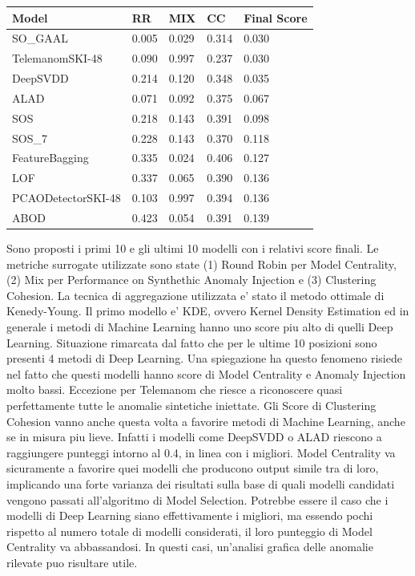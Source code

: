 \begin{table}[]
\begin{tabular}{|l|l|l|l|l|}
\hline
\textbf{Model}     & \textbf{RR} & \textbf{MIX} & \textbf{CC} & \textbf{Final Score} \\ \hline
SO\_GAAL           & 0.005       & 0.029        & 0.314       & 0.030                \\ \hline
TelemanomSKI-48    & 0.090       & 0.997        & 0.237       & 0.030                \\ \hline
DeepSVDD           & 0.214       & 0.120        & 0.348       & 0.035                \\ \hline
ALAD               & 0.071       & 0.092        & 0.375       & 0.067                \\ \hline
SOS                & 0.218       & 0.143        & 0.391       & 0.098                \\ \hline
SOS\_7             & 0.228       & 0.143        & 0.370       & 0.118                \\ \hline
FeatureBagging     & 0.335       & 0.024        & 0.406       & 0.127                \\ \hline
LOF                & 0.337       & 0.065        & 0.390       & 0.136                \\ \hline
PCAODetectorSKI-48 & 0.103       & 0.997        & 0.394       & 0.136                \\ \hline
ABOD               & 0.423       & 0.054        & 0.391       & 0.139                \\ \hline
\end{tabular}
\end{table}

Sono proposti i primi 10 e gli ultimi 10 modelli con i relativi score finali. Le metriche surrogate utilizzate sono state (1) Round Robin per Model Centrality, (2) Mix per Performance on Synthethic Anomaly Injection e (3) Clustering Cohesion. La tecnica di aggregazione utilizzata e' stato il metodo ottimale di Kenedy-Young.
Il primo modello e' KDE, ovvero Kernel Density Estimation ed in generale i metodi di Machine Learning hanno uno score piu alto di quelli Deep Learning. Situazione rimarcata dal fatto che per le ultime 10 posizioni sono presenti 4 metodi di Deep Learning. Una spiegazione ha questo fenomeno risiede nel fatto che questi modelli hanno score di Model Centrality e Anomaly Injection molto bassi. Eccezione per Telemanom che riesce a riconoscere quasi perfettamente tutte le anomalie sintetiche iniettate. Gli Score di Clustering Cohesion vanno anche questa volta a favorire metodi di Machine Learning, anche se in misura piu lieve. Infatti i modelli come DeepSVDD o ALAD riescono a  raggiungere punteggi intorno al 0.4, in linea con i migliori.
Model Centrality va sicuramente a favorire quei modelli che producono output simile tra di loro, implicando una forte varianza dei risultati sulla base di quali modelli candidati vengono passati all'algoritmo di Model Selection. Potrebbe essere il caso che i modelli di Deep Learning siano effettivamente i migliori, ma essendo pochi rispetto al numero totale di modelli considerati, il loro punteggio di Model Centrality va abbassandosi. In questi casi, un'analisi grafica delle anomalie rilevate puo risultare utile.

